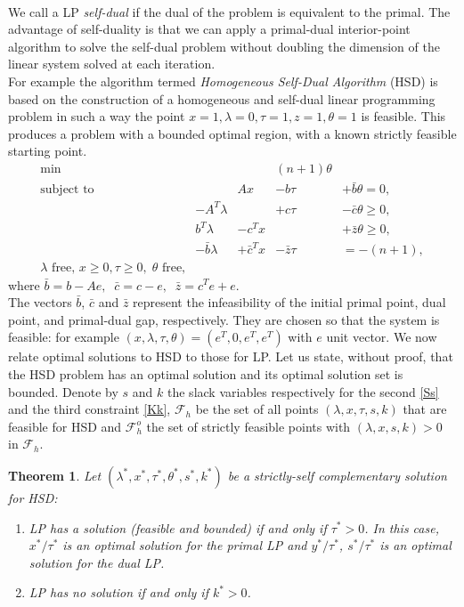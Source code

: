 \documentclass[a4paper,10 pt,titlepage,twoside]{book}
\theoremstyle{plain}
\newtheorem{thm}{Theorem}[chapter]
\theoremstyle{definition}
\theoremstyle{remark}
\begin{document}
\\
We call a LP \textit{self-dual} if the dual of the problem is equivalent to the primal. The advantage of self-duality is that we can apply a primal-dual interior-point algorithm to solve the self-dual problem without doubling the dimension of the linear system solved at each iteration.\\
For example the algorithm termed \textit{Homogeneous Self-Dual Algorithm} (HSD) is based on the construction of a homogeneous and self-dual linear programming problem in such a way the point $x=1, \lambda = 0, \tau= 1,z=1,\theta= 1$ is feasible. This produces a problem with a bounded optimal
region, with a known strictly feasible starting point.
\begin{equation*}
\begin{alignat*}{2}
\min&&&(n+1)\theta&\\
\text{subject to}&&Ax&-b\tau&+\bar{b}\theta=0,\\
&-A^{T}\lambda&&+c\tau&-\bar{c}\theta\geq0,\\\label{Ss}
&b^{T}\lambda&-c^{T}x&&+\bar{z}\theta\geq0,\\\label{Kk}
&-\bar{b}\lambda&+\bar{c}^{T}x&-\bar{z}\tau&=-(n+1),\\
\lambda\text{ free, }x\geq0,\tau\geq0, \;\theta \text{ free,} \end{alignat*}
\end{equation*}
where  $\bar{b} = b -Ae,\;\; \bar{c}=c-e,\;\;\bar{z}=c^{T}e+e$.\\
The vectors $\bar{b}$, $\bar{c}$ and $\bar{z}$ represent the infeasibility of the initial primal point, dual
point, and primal-dual gap, respectively. They are chosen so that the system is
feasible: for example $(x,\lambda, \tau,\theta)=(e^{T},0,e^{T},e^{T})$ with $e$ unit vector. We now relate optimal solutions to HSD to those for LP. Let us state, without proof, that the HSD problem has an optimal solution and its optimal solution set is bounded. \cite{LNP}
Denote by $s$ and $k$ the slack variables respectively for the second \ref{Ss} and the third constraint \ref{Kk}, $\mathcal{F}_{h}$ be the set of all points $(\lambda, x, \tau, s, k)$ that are feasible for HSD and $\mathcal{F}_{h}^{o}$ the set of strictly feasible points with $(\lambda,x,s,k)>0$ in $\mathcal{F}_{h}$.  
\begin{thm}
Let $(\lambda^{*},x^{*},\tau^{*},\theta^{*},s^{*},k^{*})$ be a strictly-self complementary solution for HSD:
\begin{enumerate}
	\item LP has a solution (feasible and bounded) if and only if $\tau^{*}>0$. In this case, $x^{*}/\tau^{*}$ is an optimal solution for the primal LP and $y^{*}/\tau^{*}$, $s^{*}/\tau^{*}$ is an optimal solution for the dual LP.
	\item LP has no solution if and only if $k^{*}>0$.
\end{enumerate} 
\end{thm}
\end{document}
